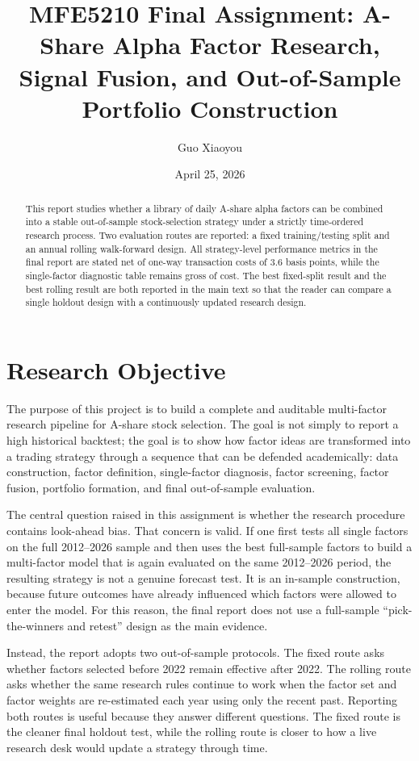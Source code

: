 \documentclass[11pt]{article}
\title{MFE5210 Final Assignment: A-Share Alpha Factor Research, Signal Fusion, and Out-of-Sample Portfolio Construction}
\author{Guo Xiaoyou}
\date{April 25, 2026}
\begin{document}
\maketitle

\begin{abstract}
This report studies whether a library of daily A-share alpha factors can be combined into a stable out-of-sample stock-selection strategy under a strictly time-ordered research process. Two evaluation routes are reported: a fixed training/testing split and an annual rolling walk-forward design. All strategy-level performance metrics in the final report are stated net of one-way transaction costs of 3.6 basis points, while the single-factor diagnostic table remains gross of cost. The best fixed-split result and the best rolling result are both reported in the main text so that the reader can compare a single holdout design with a continuously updated research design.
\end{abstract}

\section{Research Objective}

The purpose of this project is to build a complete and auditable multi-factor research pipeline for A-share stock selection. The goal is not simply to report a high historical backtest; the goal is to show how factor ideas are transformed into a trading strategy through a sequence that can be defended academically: data construction, factor definition, single-factor diagnosis, factor screening, factor fusion, portfolio formation, and final out-of-sample evaluation.

The central question raised in this assignment is whether the research procedure contains look-ahead bias. That concern is valid. If one first tests all single factors on the full 2012--2026 sample and then uses the best full-sample factors to build a multi-factor model that is again evaluated on the same 2012--2026 period, the resulting strategy is not a genuine forecast test. It is an in-sample construction, because future outcomes have already influenced which factors were allowed to enter the model. For this reason, the final report does not use a full-sample ``pick-the-winners and retest'' design as the main evidence.

Instead, the report adopts two out-of-sample protocols. The fixed route asks whether factors selected before 2022 remain effective after 2022. The rolling route asks whether the same research rules continue to work when the factor set and factor weights are re-estimated each year using only the recent past. Reporting both routes is useful because they answer different questions. The fixed route is the cleaner final holdout test, while the rolling route is closer to how a live research desk would update a strategy through time.
\end{document}
